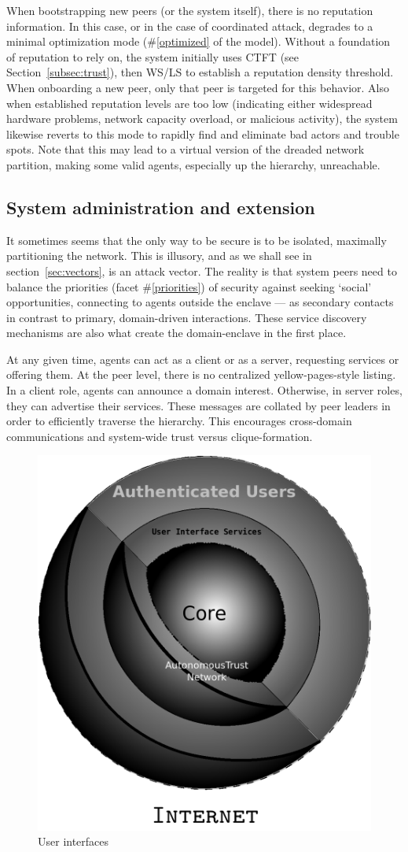 When bootstrapping new peers (or the system itself), there is no reputation information.
In this case, or in the case of coordinated attack, \projectName degrades to a minimal optimization mode (\#\ref{optimized} of the model).
Without a foundation of reputation to rely on, the system initially uses CTFT (see Section~\ref{subsec:trust}), then WS/LS to establish a reputation density threshold.
When onboarding a new peer, only that peer is targeted for this behavior.
Also when established reputation levels are too low (indicating either widespread hardware problems, network capacity overload, or malicious activity), the system likewise reverts to this mode to rapidly find and eliminate bad actors and trouble spots.
Note that this may lead to a virtual version of the dreaded network partition, making some valid agents, especially up the hierarchy, unreachable.

\begin{ppl}

\end{ppl}


\subsection{System administration and extension}\label{subsec:admin}

It sometimes seems that the only way to be secure is to be isolated, maximally partitioning the network.
This is illusory, and as we shall see in section~\ref{sec:vectors}, is an attack vector.
The reality is that system peers need to balance the priorities (facet \#\ref{priorities}) of security against seeking `social' opportunities, connecting to agents outside the enclave --- as secondary contacts in contrast to primary, domain-driven interactions.
These service discovery mechanisms are also what create the domain-enclave in the first place.

At any given time, agents can act as a client or as a server, requesting services or offering them.
At the peer level, there is no centralized yellow-pages-style listing.
In a client role, agents can announce a domain interest.
Otherwise, in server roles, they can advertise their services.
These messages are collated by peer leaders in order to efficiently traverse the hierarchy.
This encourages cross-domain communications and system-wide trust versus clique-formation.

\begin{figure}
	\centering
	\includegraphics[width=0.4\linewidth]{users}
	\caption{User interfaces}
	\label{fig:users}
\end{figure}

